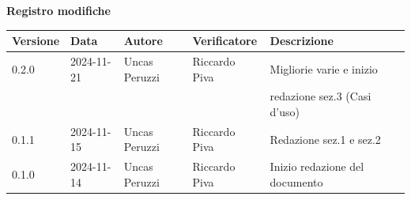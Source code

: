 \documentclass[11pt]{article}
\begin{document}
\centering\textbf{Registro modifiche}\\
\vspace{2mm}
\begin{tabular}{|l|l|l|l|l|l|}
\hline
\textbf{Versione} & \textbf{Data} & \textbf{Autore} & \textbf{Verificatore} & \textbf{Descrizione} \\
\hline
0.2.0 & 2024-11-21 & Uncas Peruzzi  & Riccardo Piva & Migliorie varie e inizio\\
& & & & redazione sez.3 (Casi d'uso) \\
\hline
0.1.1 & 2024-11-15 & Uncas Peruzzi  & Riccardo Piva & Redazione sez.1 e sez.2 \\
\hline
0.1.0 & 2024-11-14 & Uncas Peruzzi  & Riccardo Piva & Inizio redazione del documento\\
\hline
\end{tabular}
\newpage
\tableofcontents
\listoffigures %
\end{document}
